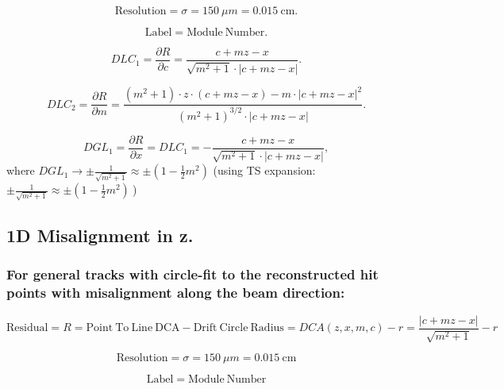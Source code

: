 \documentclass[a4paper,11pt]{article}
\begin{document}
\begin{equation}	
\mathrm{Resolution} = \sigma = 150 \ \mu m = 0.015 \ \mathrm{cm}.
\end{equation}

\begin{equation}	
\mathrm{Label}= \mathrm{Module \ Number}.
\end{equation}

\begin{equation}
DLC_1 = \frac{\partial R}{\partial c} = \frac{ c+mz-x }  { \sqrt{m^2+1} \cdot |c+mz-x| }.
\end{equation}

\begin{equation}
DLC_2 = \frac{ \partial R}{\partial m} = \frac{ (m^2+1)\cdot z\cdot(c+mz-x) - m\cdot |c+mz-x|^2 }{ (m^2+1)^{3/2} \cdot |c+mz-x|  }.
\end{equation}

\begin{equation}	
DGL_1 = \frac{\partial R}{\partial x} = DLC_1 = - \frac{ c+mz-x }  { \sqrt{m^2+1} \cdot |c+mz-x| },
\end{equation}
where $DGL_1 \rightarrow \pm \frac{1}{\sqrt{m^2+1}} \approx \pm (1-\frac{1}{2}m^2) $
(using TS expansion: $\pm \frac{1}{\sqrt{m^2+1}} \approx \pm (1-\frac{1}{2}m^2) \ $)

\clearpage

\subsection{1D Misalignment in z.}
\subsubsection{For general tracks with circle-fit to the reconstructed hit points with misalignment along the beam direction:}

\begin{equation}	
\mathrm{Residual}= R =\mathrm{Point \ To \ Line \ DCA} - \mathrm{Drift \ Circle \ Radius} = DCA(z,x,m,c) - r = \frac{ |c+mz-x| }  { \sqrt{m^2+1} } -r
\end{equation}


\begin{equation}	
\mathrm{Resolution} = \sigma = 150 \ \mu m = 0.015 \ \mathrm{cm}
\end{equation}

\begin{equation}	
\mathrm{Label}= \mathrm{Module \ Number}
\end{equation}
\end{document}
